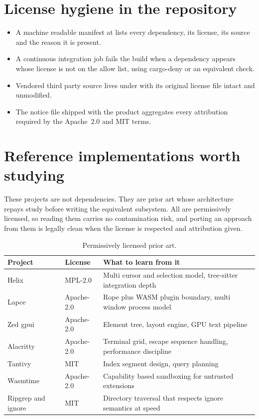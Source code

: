 \section{License hygiene in the repository}

\begin{itemize}
  \item A machine readable manifest at  lists every dependency,
  its license, its source and the reason it is present.
  \item A continuous integration job fails the build when a dependency appears whose license
  is not on the allow list, using cargo-deny or an equivalent check.
  \item Vendored third party source lives under  with its original license
  file intact and unmodified.
  \item The notice file shipped with the product aggregates every attribution required by
  the Apache~2.0 and MIT terms.
\end{itemize}

\section{Reference implementations worth studying}

These projects are not dependencies. They are prior art whose architecture repays study
before writing the equivalent subsystem. All are permissively licensed, so reading them
carries no contamination risk, and porting an approach from them is legally clean when the
license is respected and attribution given.

\begin{table}[h]
\centering
\small
\begin{tabularx}{\textwidth}{l l X}
\toprule
\textbf{Project} & \textbf{License} & \textbf{What to learn from it} \\
\midrule
Helix & MPL-2.0 & Multi cursor and selection model, tree-sitter integration depth \\
Lapce & Apache-2.0 & Rope plus WASM plugin boundary, multi window process model \\
Zed gpui & Apache-2.0 & Element tree, layout engine, GPU text pipeline \\
Alacritty & Apache-2.0 & Terminal grid, escape sequence handling, performance discipline \\
Tantivy & MIT & Index segment design, query planning \\
Wasmtime & Apache-2.0 & Capability based sandboxing for untrusted extensions \\
Ripgrep and ignore & MIT & Directory traversal that respects ignore semantics at speed \\
\bottomrule
\end{tabularx}
\caption{Permissively licensed prior art.}
\end{table}

